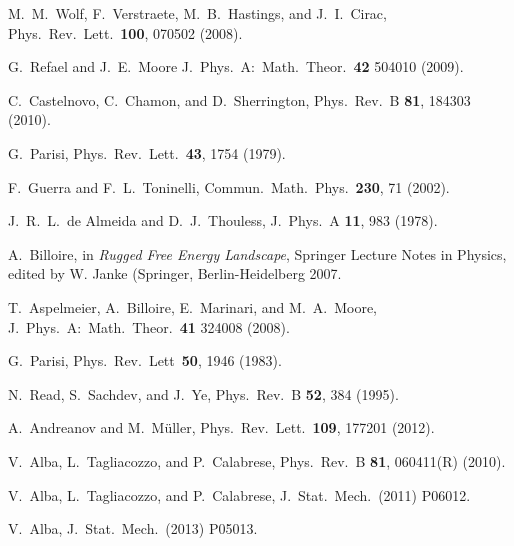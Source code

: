 \documentclass[twocolumn,superscriptaddress,prb,10pt]{revtex4-1}
\begin{document}
\begin{thebibliography}{99}
M.~M.~Wolf, F.~Verstraete, M.~B.~Hastings, and J.~I.~Cirac, Phys.\ Rev.\ Lett.\ 
{\bf 100}, 070502 (2008). 

G.~Refael and J.~E.~Moore J.\ Phys.\ A:\ Math.\ Theor.\ {\bf 42} 504010 (2009).

C.~Castelnovo, C.~Chamon, and D.~Sherrington, Phys.\ Rev.\ B {\bf 81}, 184303 (2010).

G.~Parisi, Phys.\ Rev.\ Lett.\ {\bf 43}, 1754 (1979).

F.~Guerra and F.~L.~Toninelli, Commun.\ Math.\ Phys.\ {\bf 230}, 71 (2002). 

J.~R.~L.~de Almeida and D.~J.~Thouless, J.\ Phys.\ A {\bf 11}, 983 (1978). 

A.~Billoire, in \emph{Rugged Free Energy Landscape}, Springer Lecture 
Notes in Physics, edited by W. Janke (Springer, Berlin-Heidelberg 
2007. 

T.~Aspelmeier, A.~Billoire, E.~Marinari, and M.~A.~Moore, 
J.\ Phys.\ A:\ Math.\ Theor.\ {\bf 41} 324008 (2008). 

G.~Parisi, Phys.\ Rev.\ Lett\ {\bf 50}, 1946 (1983). 

N.~Read, S.~Sachdev, and J.~Ye, Phys.\ Rev.\ B {\bf 52}, 384 (1995). 

A.~Andreanov and M.~M\"uller, Phys.\ Rev.\ Lett.\ {\bf 109}, 177201 (2012). 

V.~Alba, L.~Tagliacozzo, and P.~Calabrese, Phys.\ Rev.\ B {\bf 81}, 060411(R) (2010).

V.~Alba, L.~Tagliacozzo, and P.~Calabrese, J.\ Stat.\ Mech.\ (2011) P06012. 

V.~Alba, J.\ Stat.\ Mech.\ (2013) P05013. 









\end{thebibliography}

\end{document}
